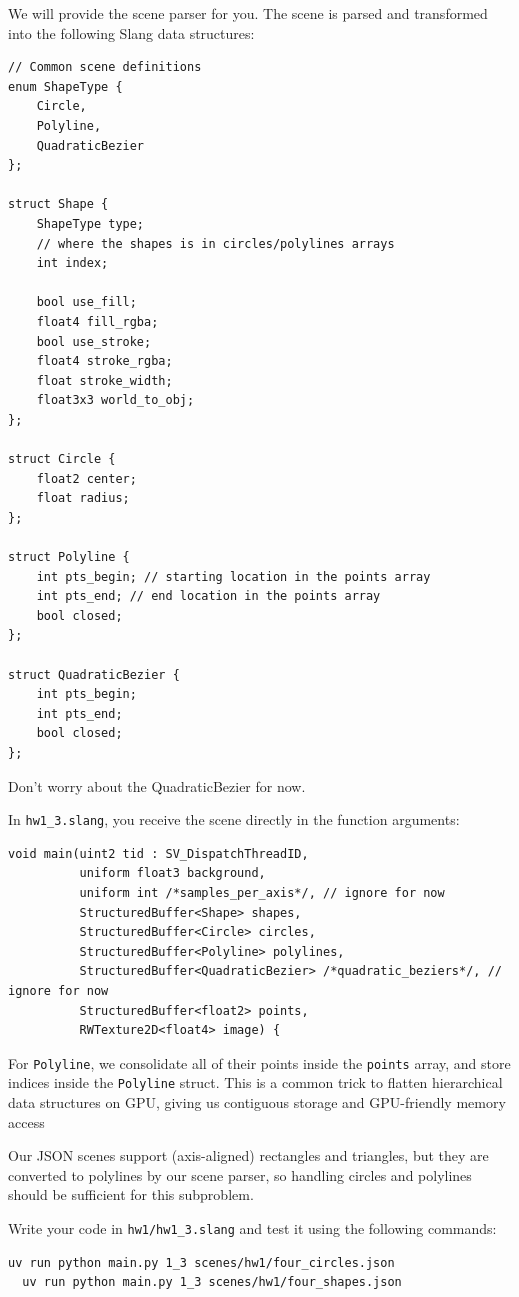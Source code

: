 We will provide the scene parser for you. The scene is parsed and transformed into the following Slang data structures:
\begin{lstlisting}[language=Slang]
// Common scene definitions
enum ShapeType {
    Circle,
    Polyline,
    QuadraticBezier
};

struct Shape {
    ShapeType type;
    // where the shapes is in circles/polylines arrays
    int index;

    bool use_fill;
    float4 fill_rgba;
    bool use_stroke;
    float4 stroke_rgba;
    float stroke_width;
    float3x3 world_to_obj;
};

struct Circle {
    float2 center;
    float radius;
};

struct Polyline {
    int pts_begin; // starting location in the points array
    int pts_end; // end location in the points array
    bool closed;
};

struct QuadraticBezier {
    int pts_begin;
    int pts_end;
    bool closed;
};
\end{lstlisting}
Don't worry about the QuadraticBezier for now. 

In \lstinline{hw1_3.slang}, you receive the scene directly in the function arguments:
\begin{lstlisting}[language=Slang]
void main(uint2 tid : SV_DispatchThreadID,
          uniform float3 background,
          uniform int /*samples_per_axis*/, // ignore for now
          StructuredBuffer<Shape> shapes,
          StructuredBuffer<Circle> circles,
          StructuredBuffer<Polyline> polylines,
          StructuredBuffer<QuadraticBezier> /*quadratic_beziers*/, // ignore for now
          StructuredBuffer<float2> points,
          RWTexture2D<float4> image) {
\end{lstlisting}

For \lstinline{Polyline}, we consolidate all of their points inside the \lstinline{points} array, and store indices inside the \lstinline{Polyline} struct. This is a common trick to flatten hierarchical data structures on GPU, giving us contiguous storage and GPU-friendly memory access

Our JSON scenes support (axis-aligned) rectangles and triangles, but they are converted to polylines by our scene parser, so handling circles and polylines should be sufficient for this subproblem.

Write your code in \lstinline{hw1/hw1_3.slang} and test it using the following commands:
\begin{lstlisting}[language=bash]
  uv run python main.py 1_3 scenes/hw1/four_circles.json
  uv run python main.py 1_3 scenes/hw1/four_shapes.json
\end{lstlisting}

